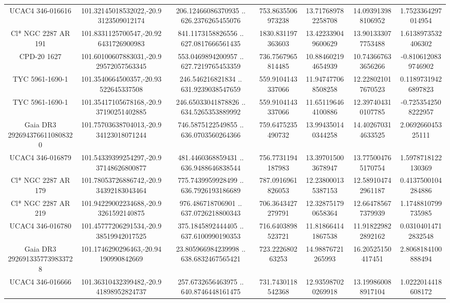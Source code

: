 \begin{table}
\begin{tabular}{ccccccc}
UCAC4 346-016616 & 101.32145018532022,-20.93123509012174 & 206.12466086370935 .. 626.2376265455076 & 753.8635506973238 & 13.717689782258708 & 14.093913988106952 & 1.7523364297014954 \\
Cl* NGC 2287     AR     191 & 101.8331125700547,-20.926431726900983 & 841.1173158826556 .. 627.0817666561435 & 1830.831197363603 & 13.422339049600629 & 13.901333077753488 & 1.6138973532406302 \\
CPD-20  1627 & 101.60100607883031,-20.929572057563345 & 553.0469894200957 .. 627.7219765453359 & 736.7567965814485 & 10.884602194654939 & 10.743667633656266 & -0.8106120839746902 \\
TYC 5961-1690-1 & 101.3540664500357,-20.93522645337508 & 246.546216821834 .. 631.9239038547659 & 559.9104143337066 & 11.947477068508258 & 12.228021017670523 & 0.11897319426897823 \\
TYC 5961-1690-1 & 101.35417105678168,-20.937190251402885 & 246.65033041878826 .. 634.5265353889992 & 559.9104143337066 & 11.651196464100886 & 12.397404310107785 & -0.7253542508222957 \\
Gaia DR3 2926943766110808320 & 101.75703638704013,-20.934123018071244 & 746.5875122549855 .. 636.0703560264366 & 759.6475235490732 & 13.994350140344258 & 14.402670314633525 & 2.069266045325111 \\
UCAC4 346-016879 & 101.54339399254297,-20.937148626800877 & 481.4460368859431 .. 636.9488646838544 & 756.7731194187983 & 13.397015003678947 & 13.775004765170754 & 1.5978718122130369 \\
Cl* NGC 2287     AR     179 & 101.78053726886742,-20.934392183043464 & 775.7439959928499 .. 636.7926193186689 & 787.0916961826053 & 12.238000135387153 & 12.589104742961187 & 0.4137500104284886 \\
Cl* NGC 2287     AR     219 & 101.94229002234688,-20.93261592140875 & 976.486718706901 .. 637.0726218800343 & 706.3643427279791 & 12.328751790658364 & 12.664785677379939 & 1.1748810799735985 \\
UCAC4 346-016780 & 101.45777206291534,-20.938519942017525 & 375.1845892444405 .. 637.6100990190353 & 716.6403898523721 & 11.818664141867538 & 11.918229822892162 & 0.03104014712832548 \\
Gaia DR3 2926913357739833728 & 101.1746290296463,-20.94190990842669 & 23.805966984239998 .. 638.6832467565421 & 723.222680263253 & 14.98876721265993 & 16.20525150417451 & 2.8068184100888494 \\
UCAC4 346-016666 & 101.36310432399482,-20.941898952824737 & 257.6732656463975 .. 640.8746448161475 & 731.7430118542368 & 12.935987020269918 & 13.199860088917104 & 1.0222014418608172 \\

\end{tabular}
\end{table}
